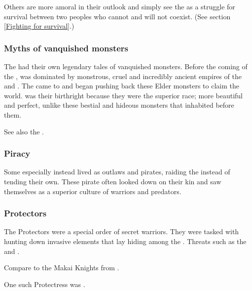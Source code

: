 Others are more amoral in their outlook and simply see the \secretwar{} as a struggle for survival between two peoples who cannot and will not coexist. (See section \ref{Fighting for survival}.)





\subsubsection{Myths of vanquished monsters}
The \resphain had their own legendary tales of vanquished monsters. 
Before the coming of the \resphain, \Miith was dominated by monstrous, cruel and incredibly ancient empires of the \dragons and \ophidians. 
The \resphain came to \Miith and began pushing back these Elder monsters to claim the world.
\Miith was their birthright because they were the superior race; more beautiful and perfect, unlike these bestial and hideous monsters that inhabited \Miith before them. 

See also the . 





\subsubsection{Piracy}
Some \resphain\dash especially \dash instead lived as outlaws and pirates, raiding the  instead of tending their own.
These pirate \resphain often looked down on their  kin and saw themselves as a superior culture of warriors and predators.





\subsubsection{Protectors}
The \resphan Protectors were a special order of secret warriors.
They were tasked with hunting down invasive elements that lay hiding among the \resphain.
Threats such as the  and .

Compare to the Makai Knights from \cite{TV:Garo}. 

One such Protectress was . 


